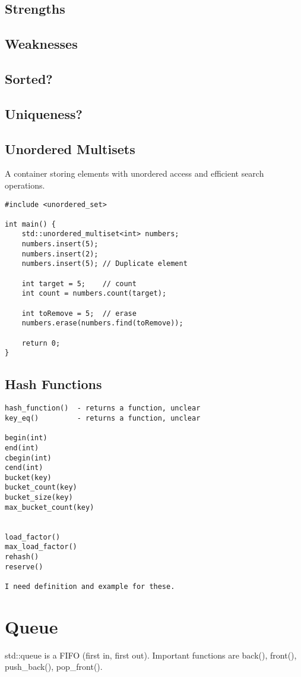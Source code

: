 \documentclass[openany]{report}
\begin{document}
\subsection{Strengths}
\subsection{Weaknesses}
\subsection{Sorted?}
\subsection{Uniqueness?}

\subsection{Unordered Multisets}

A container storing elements with unordered access and efficient search operations.

\begin{verbatim}
#include <unordered_set>

int main() {
    std::unordered_multiset<int> numbers;
    numbers.insert(5);
    numbers.insert(2);
    numbers.insert(5); // Duplicate element

    int target = 5;    // count  
    int count = numbers.count(target); 

    int toRemove = 5;  // erase
    numbers.erase(numbers.find(toRemove));

    return 0;
}
\end{verbatim}

\subsection{Hash Functions}

\begin{verbatim}
hash_function()  - returns a function, unclear
key_eq()         - returns a function, unclear 

begin(int)
end(int)
cbegin(int)
cend(int)
bucket(key)
bucket_count(key)
bucket_size(key)
max_bucket_count(key)


load_factor()
max_load_factor()
rehash()
reserve()

I need definition and example for these.
\end{verbatim}

\section{Queue}
std::queue is a FIFO (first in, first out). Important functions are back(), front(), push\_back(), pop\_front().
\end{document}
